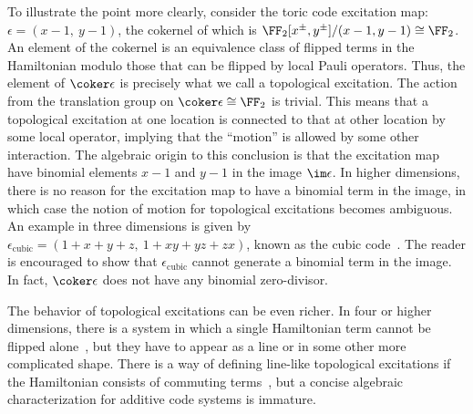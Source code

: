 To illustrate the point more clearly,
consider the toric code excitation map: $\epsilon = ( x-1,~ y-1)$,
the cokernel of which is $\FF_2[x^\pm, y^\pm]/(x-1,y-1) \cong \FF_2$.
An element of the cokernel is an equivalence class of flipped terms
in the Hamiltonian modulo those that can be flipped by local Pauli operators.
Thus, the element of $\coker \epsilon$ is precisely what we call a topological excitation.
The action from the translation group on $\coker \epsilon \cong \FF_2$
is trivial. This means that a topological excitation at one location
is connected to that at other location by some local operator,
implying that the ``motion'' is allowed by some other interaction.
The algebraic origin to this conclusion is that the excitation map have binomial
elements $x-1$ and $y-1$ in the image $\im \epsilon$.
In higher dimensions, there is no reason for the excitation map to have
a binomial term in the image,
in which case the notion of motion for topological excitations becomes ambiguous.
An example in three dimensions is given by 
$\epsilon_\text{cubic} =( 1+x+y+z,~1+xy+yz+zx )$, known as the cubic code~\cite{Haah2011Local}.
The reader is encouraged to show that $\epsilon_\text{cubic}$
cannot generate a binomial term
in the image. 
In fact, $\coker \epsilon$ does not have any binomial zero-divisor.

The behavior of topological excitations can be even richer.
In four or higher dimensions, there is a system
in which a single Hamiltonian term cannot be flipped
alone~\cite{DennisKitaevLandahlEtAl2002Topological},
but they have to appear as a line or in some other more complicated shape.
There is a way of defining line-like topological excitations if the Hamiltonian
consists of commuting terms~\cite{Haah2014invariant},
but a concise algebraic characterization for additive code systems is immature.